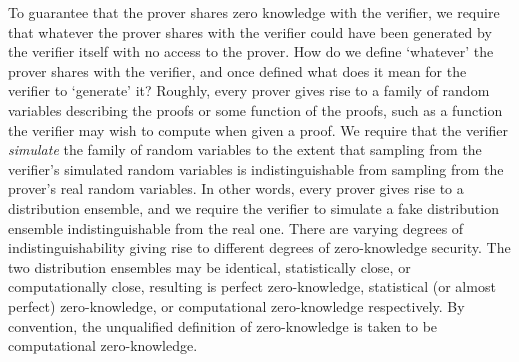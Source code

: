 \begin{remark}
    To guarantee that the prover shares zero knowledge with the verifier, we require that whatever the prover shares with the verifier could have been generated by the verifier itself with no access to the prover.
    How do we define `whatever' the prover shares with the verifier, and once defined what does it mean for the verifier to `generate' it?
    Roughly, every prover gives rise to a family of random variables describing the proofs or some function of the proofs, such as a function the verifier may wish to compute when given a proof.
    We require that the verifier \emph{simulate} the family of random variables to the extent that sampling from the verifier's simulated random variables is indistinguishable from sampling from the prover's real random variables.
    In other words, every prover gives rise to a distribution ensemble, and we require the verifier to simulate a fake distribution ensemble indistinguishable from the real one.
    There are varying degrees of indistinguishability giving rise to different degrees of zero-knowledge security.
    The two distribution ensembles may be identical, statistically close, or computationally close, resulting is perfect zero-knowledge, statistical (or almost perfect) zero-knowledge, or computational zero-knowledge respectively.
    By convention, the unqualified definition of zero-knowledge is taken to be computational zero-knowledge.
\end{remark}
